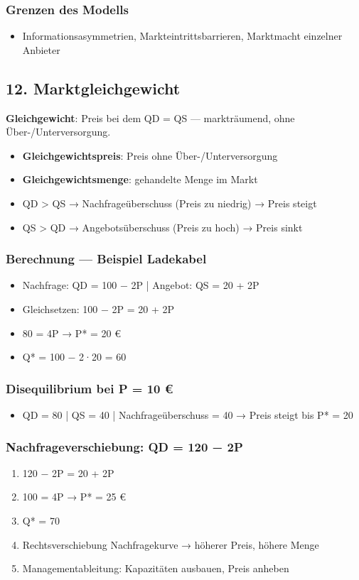 \documentclass[11pt, a4paper]{article}
\begin{document}
\subsubsection{Grenzen des Modells}
\begin{itemize}
  \item Informationsasymmetrien, Markteintrittsbarrieren, Marktmacht einzelner Anbieter
\end{itemize}


\subsection{12. Marktgleichgewicht}

\textbf{Gleichgewicht}: Preis bei dem QD = QS — markträumend, ohne Über-/Unterversorgung.

\begin{itemize}
  \item \textbf{Gleichgewichtspreis}: Preis ohne Über-/Unterversorgung
  \item \textbf{Gleichgewichtsmenge}: gehandelte Menge im Markt
  \item QD > QS → Nachfrageüberschuss (Preis zu niedrig) → Preis steigt
  \item QS > QD → Angebotsüberschuss (Preis zu hoch) → Preis sinkt
\end{itemize}


\subsubsection{Berechnung — Beispiel Ladekabel}
\begin{itemize}
  \item Nachfrage: QD = 100 − 2P | Angebot: QS = 20 + 2P
  \item Gleichsetzen: 100 − 2P = 20 + 2P
  \item 80 = 4P → P* = 20 €
  \item Q* = 100 − 2·20 = 60
\end{itemize}


\subsubsection{Disequilibrium bei P = 10 €}
\begin{itemize}
  \item QD = 80 | QS = 40 | Nachfrageüberschuss = 40 → Preis steigt bis P* = 20
\end{itemize}


\subsubsection{Nachfrageverschiebung: QD = 120 − 2P}
\begin{enumerate}
  \item 120 − 2P = 20 + 2P
  \item 100 = 4P → P* = 25 €
  \item Q* = 70
  \item Rechtsverschiebung Nachfragekurve → höherer Preis, höhere Menge
  \item Managementableitung: Kapazitäten ausbauen, Preis anheben
\end{enumerate}
\end{document}
